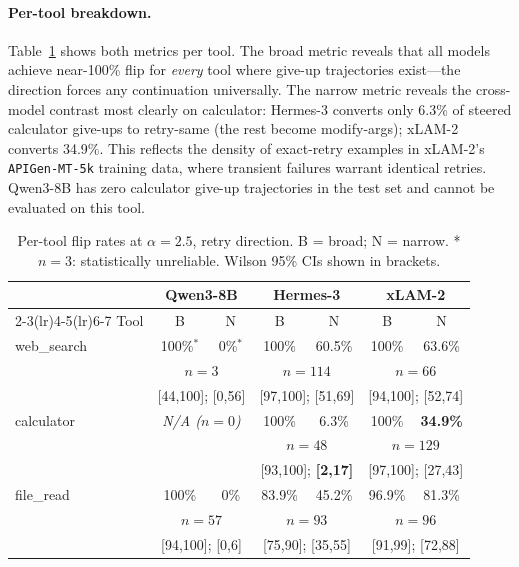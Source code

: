 \documentclass{article}
\begin{document}
\paragraph{Per-tool breakdown.}
Table~\ref{tab:pertool} shows both metrics per tool.
The broad metric reveals that all models achieve near-100\% flip for
\emph{every} tool where give-up trajectories exist---the direction
forces any continuation universally.
The narrow metric reveals the cross-model contrast most clearly
on calculator: Hermes-3 converts only 6.3\% of steered calculator
give-ups to retry-same (the rest become modify-args); xLAM-2 converts
34.9\%.
This reflects the density of exact-retry examples in xLAM-2's
\texttt{APIGen-MT-5k} training data, where transient failures
warrant identical retries.
Qwen3-8B has zero calculator give-up trajectories in the test set
and cannot be evaluated on this tool.

\begin{table}[t]
\caption{Per-tool flip rates at $\alpha{=}2.5$, retry direction.
B = broad; N = narrow. *$n{=}3$: statistically unreliable.
Wilson 95\% CIs shown in brackets.}
\label{tab:pertool}
\centering\small
\begin{tabular}{lcccccc}
\toprule
& \multicolumn{2}{c}{Qwen3-8B} & \multicolumn{2}{c}{Hermes-3} & \multicolumn{2}{c}{xLAM-2} \\
\cmidrule(lr){2-3}\cmidrule(lr){4-5}\cmidrule(lr){6-7}
Tool & B & N & B & N & B & N \\
\midrule
web\_search  & 100\%$^*$ & 0\%$^*$ & 100\% & 60.5\% & 100\% & 63.6\% \\
             & \multicolumn{2}{c}{\small$n{=}3$}
             & \multicolumn{2}{c}{\small$n{=}114$}
             & \multicolumn{2}{c}{\small$n{=}66$} \\
             & \multicolumn{2}{c}{\scriptsize[44,100]; [0,56]}
             & \multicolumn{2}{c}{\scriptsize[97,100]; [51,69]}
             & \multicolumn{2}{c}{\scriptsize[94,100]; [52,74]} \\[2pt]
calculator   & \multicolumn{2}{c}{\textit{N/A ($n{=}0$)}} & 100\% & 6.3\% & 100\% & \textbf{34.9\%} \\
             & \multicolumn{2}{c}{}
             & \multicolumn{2}{c}{\small$n{=}48$}
             & \multicolumn{2}{c}{\small$n{=}129$} \\
             & \multicolumn{2}{c}{}
             & \multicolumn{2}{c}{\scriptsize[93,100]; \textbf{[2,17]}}
             & \multicolumn{2}{c}{\scriptsize[97,100]; [27,43]} \\[2pt]
file\_read   & 100\% & 0\% & 83.9\% & 45.2\% & 96.9\% & 81.3\% \\
             & \multicolumn{2}{c}{\small$n{=}57$}
             & \multicolumn{2}{c}{\small$n{=}93$}
             & \multicolumn{2}{c}{\small$n{=}96$} \\
             & \multicolumn{2}{c}{\scriptsize[94,100]; [0,6]}
             & \multicolumn{2}{c}{\scriptsize[75,90]; [35,55]}
             & \multicolumn{2}{c}{\scriptsize[91,99]; [72,88]} \\
\bottomrule
\end{tabular}
\end{table}
\end{document}
